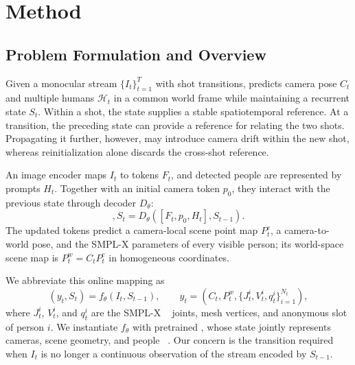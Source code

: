 \section{Method}
\label{sec:method}

\subsection{Problem Formulation and Overview}

Given a monocular stream $\{I_t\}_{t=1}^{T}$ with shot transitions,
\method{} predicts camera pose $C_t$ and multiple humans $\mathcal H_t$ in a
common world frame while maintaining a recurrent state $S_t$. Within a shot,
the state supplies a stable spatiotemporal reference. At a transition, the
preceding state can provide a reference for relating the two shots. Propagating
it further, however, may introduce camera drift within the new shot, whereas
reinitialization alone discards the cross-shot reference.

An image encoder maps $I_t$ to tokens $F_t$, and detected people are represented
by prompts $H_t$. Together with an initial camera token $p_0$, they interact
with the previous state through decoder $D_\theta$:
\begin{equation}
 [F'_t,p_t,H'_t],S_t=D_\theta([F_t,p_0,H_t],S_{t-1}).
 \label{eq:stateful-reconstruction}
\end{equation}
The updated tokens predict a camera-local scene point map $P_t^c$, a
camera-to-world pose, and the SMPL-X parameters of every visible person; its
world-space scene map is $P_t^w=C_tP_t^c$ in homogeneous coordinates.

We abbreviate this online mapping as
\begin{equation}
 (y_t,S_t)=f_\theta(I_t,S_{t-1}),\qquad
 y_t=\left(C_t,P_t^w,\{J_t^i,V_t^i,q_t^i\}_{i=1}^{N_t}\right),
 \label{eq:online-map}
\end{equation}
where $J_t^i$, $V_t^i$, and $q_t^i$ are the SMPL-X
~\citep{pavlakos2019smplx} joints, mesh vertices, and anonymous slot of person
$i$. We instantiate $f_\theta$ with pretrained \humanthree{}, whose state
jointly represents cameras, scene geometry, and people
~\citep{chen2026human3r}. Our concern is the transition required when $I_t$ is
no longer a continuous observation of the stream encoded by $S_{t-1}$.

